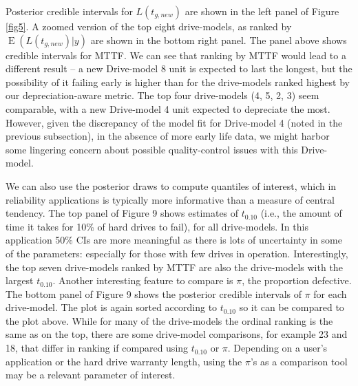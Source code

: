 \documentclass[12pt]{article}
\newcommand{\op}{\operatorname}
\begin{document}
Posterior credible intervals for $L(t_{g,new})$ are shown in the left panel of Figure \ref{fig5}. A zoomed version of the top eight drive-models, as ranked by $\op{E}(L(t_{g,new})|y)$ are shown in the bottom right panel. The panel above shows credible intervals for MTTF. We can see that ranking by MTTF would lead to a different result -- a new Drive-model 8 unit is expected to last the longest, but the possibility of it failing early is higher than for the drive-models ranked highest by our depreciation-aware metric. The top four drive-models (4, 5, 2, 3) seem comparable, with a new Drive-model 4 unit expected to depreciate the most. However, given the discrepancy of the model fit for Drive-model 4 (noted in the previous subsection), in the absence of more early life data, we might harbor some lingering concern about possible quality-control issues with this Drive-model.

We can also use the posterior draws to compute quantiles of interest, which in reliability applications is typically more informative than a measure of central tendency.  The top panel of Figure 9 shows estimates of $t_{0.10}$ (i.e., the amount of time it takes for 10\% of hard drives to fail), for all drive-models.  In this application 50\% CIs are more meaningful as there is lots of uncertainty in some of the parameters: especially for those with few drives in operation.  Interestingly, the top seven drive-models ranked by MTTF are also the drive-models with the largest $t_{0.10}$.  Another interesting feature to compare is $\pi$, the proportion defective.  The bottom panel of Figure 9 shows the posterior credible intervals of $\pi$ for each drive-model.  The plot is again sorted according to $t_{0.10}$ so it can be compared to the plot above.  While for many of the drive-models the ordinal ranking is the same as on the top, there are some drive-model comparisons, for example 23 and 18, that differ in ranking if compared using $t_{0.10}$ or $\pi$.  Depending on a user's application or the hard drive warranty length, using the $\pi$'s as a comparison tool may be a relevant parameter of interest.  
\end{document}
